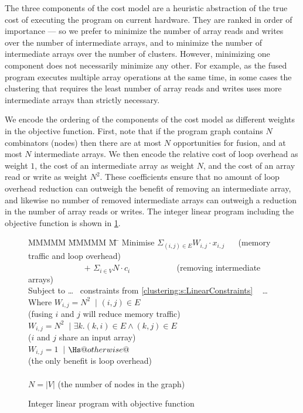 The three components of the cost model are a heuristic abstraction of the true cost of executing the program on current hardware.
They are ranked in order of importance --- so we prefer to minimize the number of array reads and writes over the number of intermediate arrays, and to minimize the number of intermediate arrays over the number of clusters.
However, minimizing one component does not necessarily minimize any other.
For example, as the fused program executes multiple array operations at the same time, in some cases the clustering that requires the least number of array reads and writes uses more intermediate arrays than strictly necessary.

We encode the ordering of the components of the cost model as different weights in the objective function.
First, note that if the program graph contains $N$ combinators (nodes) then there are at most $N$ opportunities for fusion, and at most $N$ intermediate arrays.
We then encode the relative cost of loop overhead as weight $1$, the cost of an intermediate array as weight $N$, and the cost of an array read or write as weight $N^2$.
These coefficients ensure that no amount of loop overhead reduction can outweigh the benefit of removing an intermediate array, and likewise no number of removed intermediate arrays can outweigh a reduction in the number of array reads or writes.
The integer linear program including the objective function is shown in \cref{fig:clustering:ilp-obj}.

\begin{figure}
\begin{tabbing}
MMMMM   \= MMMMM \= M \= \kill
Minimise   \>     $\Sigma_{(i,j) \in E} W_{i,j} \cdot x_{i,j}$   
                        ~~ (memory traffic and loop overhead)
\\ ~~~~~~~~~~~~~ $+$ \> $\Sigma_{i \in V} N \cdot c_i$
                        ~~~~~~~~~~ (removing intermediate arrays)
\\[1ex]
   Subject to  \> \ldots ~ constraints from \cref{clustering:s:LinearConstraints} ~ \ldots 
\\ Where   \> $W_{i,j} = N^2$ \> $~|$ \> $(i,j) \in E $         
\\         \> \> \> (fusing $i$ and $j$ will reduce memory traffic)         
\\         \> $W_{i,j} = N^2$ \> $~|$ \> $\exists k. (k,i) \in E \wedge (k,j) \in E $     
\\         \> \> \> ($i$ and $j$ share an input array)
\\         \> $W_{i,j} = 1$   \> $~|$ \> $\Hs@otherwise@$
\\         \> \> \> (the only benefit is loop overhead)
\\
\\
           \> $N = |V|$
           \> \> (the number of nodes in the graph)
\end{tabbing}
\caption{Integer linear program with objective function}
\label{fig:clustering:ilp-obj}
\end{figure}

